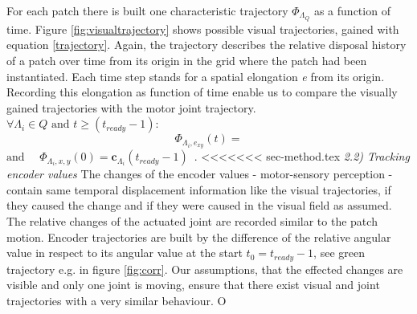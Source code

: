 For each patch there is built one characteristic trajectory $ \Phi_{\Lambda_Q} $ as a function of time. Figure \ref{fig:visualtrajectory} shows possible visual trajectories, gained with equation \ref{trajectory}. Again, the trajectory describes the relative disposal history of a patch over time from its origin in the grid where the patch had been instantiated. Each time step stands for a spatial elongation \textit{e} from its origin. Recording this elongation as function of time enable us to compare the visually gained trajectories with the motor joint trajectory. 
%
$\forall \Lambda_i \in Q \mbox{ and } t \geq \left( t_{ready} -1\right) :   $
\begin{equation}
\label{trajectory}
	\Phi_{\Lambda_{i}, e_{xy}} \left( t \right) = %
\end{equation} 
$\mbox{and } \quad \Phi_{\Lambda_i , x,y} \left( 0 \right) = \mathbf{c}_{\Lambda_i} \left( t_{ready} -1 \right) \enspace .$
%
%
%
%
%
<<<<<<< sec-method.tex
\textit{2.2) Tracking encoder values}\newline%
The changes of the encoder values - motor-sensory perception - contain same temporal displacement information like the visual trajectories, if they caused the change and if they were caused in the visual field as assumed. The relative changes of the actuated joint are recorded similar to the patch motion.  Encoder trajectories are built by the difference of the relative angular value in respect to its angular value at the start $t_0 = t_{ready}-1$, see green trajectory e.g. in figure \ref{fig:corr}. Our assumptions, that the effected changes are visible and only one joint is moving, ensure that there exist visual and joint trajectories with a very similar behaviour. O%
